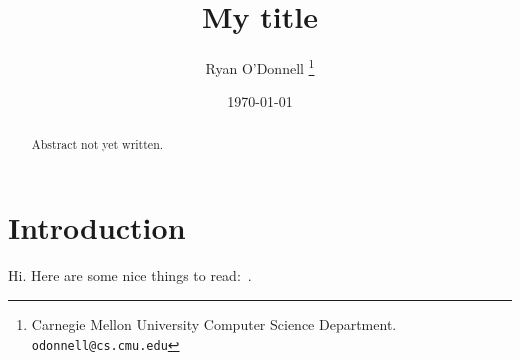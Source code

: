 \documentclass[11pt]{article}
\begin{document}
\title{My title}

\author{Ryan O'Donnell%
            \thanks{Carnegie Mellon University Computer Science Department.
                        \texttt{odonnell@cs.cmu.edu} }
}

\date{\today}

\maketitle

\begin{abstract}
    Abstract not yet written.
\end{abstract}

\section{Introduction} \label{sec:intro}

Hi.  Here are some nice things to read:~\cite{AS16,ER60,JHS21,Per02,Wil07}.




\end{document}
